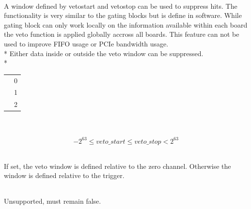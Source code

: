 {	\\
	A window defined by \textsf{veto\tu start} and \textsf{veto\tu stop} can be used to suppress hits. 
	The functionality is very similar to the gating blocks but is define in software. 
	While gating block can only work locally on the information available within each board the veto function is applied globally accross all boards.
	This feature can not be used to improve FIFO usage or PCIe bandwidth usage. 
	 \\*
	Either data inside or outside the veto window can be suppressed.\\*
	\begin{tabular}{lc}
		\ttdef{VETO\tu OFF}     & 0 \\
		\ttdef{VETO\tu INSIDE}  & 1 \\
		\ttdef{VETO\tu OUTSIDE} & 2 \\
	\end{tabular}\par

	\\
	\\
	\[
		-2^{63} \le veto\_ start \le veto\_ stop < 2^{63} 
	\]\par

	\\
	If set, the veto window is defined relative to the zero channel. Otherwise the window is defined relative to the trigger.\par 

	\\
	Unsupported, must remain \textsf{false}.

}{}